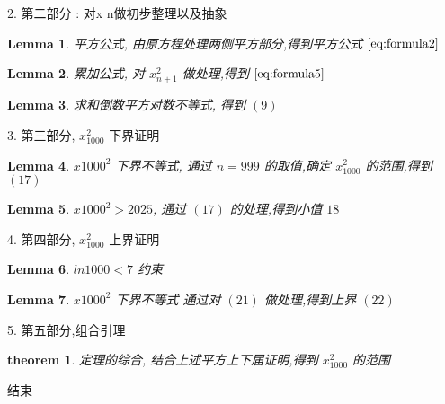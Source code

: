 \documentclass[11pt]{article}
\newtheorem{theorem}{theorem}
\newtheorem{lemma}{Lemma}
\begin{document}
2. 第二部分 : 对x n做初步整理以及抽象

\begin{lemma}
    平方公式,
    由原方程处理两侧平方部分,得到平方公式 $\eqref{eq:formula2}$
\end{lemma}

\begin{lemma}
    累加公式,
    对 $x_{n+1}^2$ 做处理,得到 $\eqref{eq:formula5}$
\end{lemma}

\begin{lemma}
    求和倒数平方对数不等式,
    得到 $(9)$
\end{lemma}

3. 第三部分, $x_{1000}^2$ 下界证明

\begin{lemma}
    $x 1000 ^2$ 下界不等式,
    通过 $n=999$ 的取值,确定 $x_{1000}^2$ 的范围,得到 $(17)$
\end{lemma}

\begin{lemma}
    $x 1000 ^2 > 2025$,
    通过 $(17)$ 的处理,得到小值 $18$
\end{lemma}

4. 第四部分, $x_{1000}^2$ 上界证明

\begin{lemma}
    $ln 1000 < 7$ 约束
\end{lemma}

\begin{lemma}
    $x 1000 ^2$ 下界不等式
    通过对 $(21)$ 做处理,得到上界 $(22)$
\end{lemma}

5. 第五部分,组合引理

\begin{theorem}
    定理的综合,
    结合上述平方上下届证明,得到 $x_{1000}^2$ 的范围
\end{theorem}

结束
\end{document}

